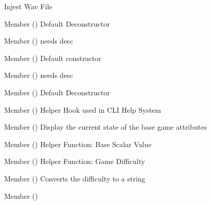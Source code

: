 \begin{DoxyRefList}
%
Injest Wav File  
\item[Member \doxylink{class_audio_driver_a4082b312c829c2e9d3cc787118a44ec1}{Audio\+Driver\+::\texorpdfstring{$\sim$}{\string~}\+Audio\+Driver} ()]\label{todo__todo000048}%
%
Default Deconstructor  
\item[Member \doxylink{class_audio_mixer_a4a96925b60f7a3fd1fb4dc183b9c08f7}{Audio\+Mixer\+::\+\_\+help} ()]\label{todo__todo000003}%
%
needs desc  
\item[Member \doxylink{class_audio_mixer_aaff2ce84f3b16a3b368469a5753c5f82}{Audio\+Mixer\+::Audio\+Mixer} ()]\label{todo__todo000001}%
%
Default constructor  
\item[Member \doxylink{class_audio_mixer_a5fec74f79078005e61b3baf45ccb0bcf}{Audio\+Mixer\+::print\+\_\+help} ()]\label{todo__todo000002}%
%
needs desc  
\item[Member \doxylink{class_audio_mixer_aa6e93c4860c5b12e0ea5605e53636b3f}{Audio\+Mixer\+::\texorpdfstring{$\sim$}{\string~}\+Audio\+Mixer} ()]\label{todo__todo000004}%
%
Default Deconstructor  
\item[Member \doxylink{class_balance_controller_a8936276becef1b520f9b92984e9cf46f}{Balance\+Controller\+::\+\_\+help} ()]\label{todo__todo000055}%
%
Helper Hook used in CLI Help System  
\item[Member \doxylink{class_balance_controller_a13eb2d765e0aa528b131b32dd1940fac}{Balance\+Controller\+::display\+\_\+state} ()]\label{todo__todo000051}%
%
Display the current state of the base game attributes  
\item[Member \doxylink{class_balance_controller_a68f4371ae68f48c5040906949cab77b4}{Balance\+Controller\+::get\+\_\+base} ()]\label{todo__todo000052}%
%
Helper Function\+: Base Scalar Value  
\item[Member \doxylink{class_balance_controller_ab533d0f17d9e616c208049dc318a9dc8}{Balance\+Controller\+::get\+\_\+difficulty} ()]\label{todo__todo000053}%
%
Helper Function\+: Game Difficulty  
\item[Member \doxylink{class_balance_controller_a882a510066a59049b37bacd83a303267}{Balance\+Controller\+::get\+\_\+difficulty\+\_\+str} ()]\label{todo__todo000054}%
%
Converts the difficulty to a string  
\item[Member \doxylink{class_balance_controller_a570c607b223a0a9c033603e833458251}{Balance\+Controller\+::Get\+Instance} ()]\label{todo__todo000049}%

\end{DoxyRefList}
